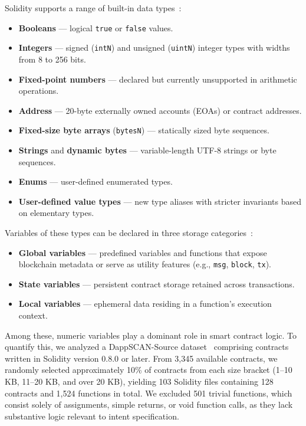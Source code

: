 \documentclass[10pt, conference]{IEEEtran}
\begin{document}
Solidity supports a range of built-in data types~\cite{soltype}:
\begin{itemize}
    \item \textbf{Booleans} — logical \texttt{true} or \texttt{false} values.
    \item \textbf{Integers} — signed (\texttt{intN}) and unsigned (\texttt{uintN}) integer types with widths from 8 to 256 bits.
    \item \textbf{Fixed-point numbers} — declared but currently unsupported in arithmetic operations.
    \item \textbf{Address} — 20-byte externally owned accounts (EOAs) or contract addresses.
    \item \textbf{Fixed-size byte arrays} (\texttt{bytesN}) — statically sized byte sequences.
    \item \textbf{Strings} and \textbf{dynamic bytes} — variable-length UTF-8 strings or byte sequences.
    \item \textbf{Enums} — user-defined enumerated types.
    \item \textbf{User-defined value types} — new type aliases with stricter invariants based on elementary types.
\end{itemize}

Variables of these types can be declared in three storage categories~\cite{solgvar, solsvar}:
\begin{itemize}
    \item \textbf{Global variables} — predefined variables and functions that expose blockchain metadata or serve as utility features (e.g., \texttt{msg}, \texttt{block}, \texttt{tx}).
    \item \textbf{State variables} — persistent contract storage retained across transactions.
    \item \textbf{Local variables} — ephemeral data residing in a function’s execution context.
\end{itemize}

Among these, numeric variables play a dominant role in smart contract logic. To quantify this, we analyzed a DappSCAN-Source dataset~\cite{dappscan} comprising contracts written in Solidity version 0.8.0 or later. From 3,345 available contracts, we randomly selected approximately 10\% of contracts from each size bracket (1–10 KB, 11–20 KB, and over 20 KB), yielding 103 Solidity files containing 128 contracts and 1,524 functions in total. We excluded 501 trivial functions, which consist solely of assignments, simple returns, or void function calls, as they lack substantive logic relevant to intent specification. 
\end{document}
